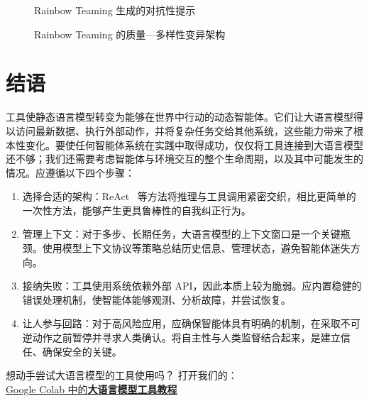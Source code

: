 \begin{figure}
  \begin{center}
    
    \caption{Rainbow Teaming 生成的对抗性提示 \citep{samvelyan2024rainbow}\label{fig:rainbow} }
  \end{center}
\end{figure}

\begin{figure}
  \begin{center}
    
    \caption{Rainbow Teaming 的质量—多样性变异架构 \citep{samvelyan2024rainbow}\label{fig:rainbow2} }
  \end{center}
\end{figure}



\section{结语}
工具使静态语言模型转变为能够在世界中行动的动态智能体。它们让大语言模型得以访问最新数据、执行外部动作，并将复杂任务交给其他系统，这些能力带来了根本性变化。要使任何智能体系统在实践中取得成功，仅仅将工具连接到大语言模型还不够；我们还需要考虑智能体与环境交互的整个生命周期，以及其中可能发生的情况。应遵循以下四个步骤：

\begin{enumerate}
    \item 选择合适的架构：ReAct~\citep{yao2022react} 等方法将推理与工具调用紧密交织，相比更简单的一次性方法，能够产生更具鲁棒性的自我纠正行为。
    \item 管理上下文：对于多步、长期任务，大语言模型的上下文窗口是一个关键瓶颈。使用模型上下文协议等策略总结历史信息、管理状态，避免智能体迷失方向。
    \item 接纳失败：工具使用系统依赖外部 API，因此本质上较为脆弱。应内置稳健的错误处理机制，使智能体能够观测、分析故障，并尝试恢复。
    \item 让人参与回路：对于高风险应用，应确保智能体具有明确的机制，在采取不可逆动作之前暂停并寻求人类确认。将自主性与人类监督结合起来，是建立信任、确保安全的关键。
\end{enumerate}

\begin{tcolorbox}[
    colback=blue!10!white,
    colframe=blue!85!black,
    title={\faRocket\quad 亲自试一试！},
    fonttitle=\bfseries,
    coltitle=white,
    boxrule=1pt,
    arc=4pt,
    left=5pt,
    right=5pt,
    top=5pt,
    bottom=5pt,
    enhanced
]
想动手尝试大语言模型的工具使用吗？
打开我们的：\\
\href{https://colab.research.google.com/github/Agentic-LLMs/Agentic-AI-tutorials/blob/main/tools_tutorial.ipynb}{\faCode\quad Google Colab 中的\textbf{大语言模型工具教程}}
\end{tcolorbox}

